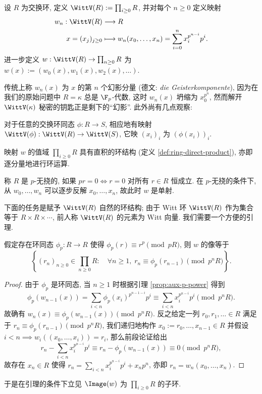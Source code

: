 \begin{definition}
	设 $R$ 为交换环, 定义 $\WittV(R) := \prod_{i \geq 0} R$, 并对每个 $n \geq 0$ 定义映射
	\begin{align*}
		w_n: \WittV(R) & \longrightarrow R \\
		x = (x_j)_{j \geq 0} & \longmapsto w_n(x_0, \ldots, x_n) = \sum_{i=0}^n x_i^{p^{n-i}} p^i.
	\end{align*}
	进一步定义 $w: \WittV(R) \to \prod_{n \geq 0} R$ 为 $w(x) := (w_0(x), w_1(x), w_2(x), \ldots)$.
\end{definition}
传统上称 $w_n(x)$ 为 $x$ 的第 $n$ 个幻影分量 (德文: \textit{die Geisterkomponente}), 因为在我们的原始问题中 $R=\kappa$ 总是 $\F_p$-代数, 这时 $w_n(x)$ 坍缩为 $x_0^{p^n}$, 然而解开 $\WittV(\kappa)$ 秘密的钥匙正是剩下的``幻影''. 此外尚有几点观察:
\begin{compactitem}
	\item 对于任意的交换环同态 $\phi: R \to S$, 相应地有映射 $\WittV(\phi): \WittV(R) \to \WittV(S)$, 它映 $(x_i)_i$ 为 $(\phi(x_i))_i$.
	\item 映射 $w$ 的值域 $\prod_{i \geq 0} R$ 具有直积的环结构 (定义 \ref{def:ring-direct-product}), 亦即逐分量地进行环运算.
	\item 称 $R$ 是 $p$-无挠的, 如果 $pr =0 \iff r=0$ 对所有 $r \in R$ 恒成立. 在 $p$-无挠的条件下, 从 $w_0, \ldots, w_n$ 可以逐步反解 $x_0, \ldots, x_n$, 故此时 $w$ 是单射. 
\end{compactitem}

下面的任务是赋予 $\WittV(R)$ 自然的环结构; 由于 Witt 环 $\WittV(R)$ 作为集合等于 $R \times R \times \cdots$, 前人称 $\WittV(R)$ 的元素为 Witt 向量. 我们需要一个方便的引理.
\begin{lemma}[B.\ Dwork]\label{prop:Dwork-Witt}
	假定存在环同态 $\phi_p: R \to R$ 使得 $\phi_p(r) \equiv r^p \pmod {pR}$, 则 $w$ 的像等于
	\[ \left\{ (r_n)_{n \geq 0} \in \prod_{n \geq 0} R : \quad \forall n \geq 1, \; r_n \equiv \phi_p(r_{n-1}) \pmod {p^n R}  \right\}. \]
\end{lemma}
\begin{proof}
	由于 $\phi_p$ 是环同态, 当 $n \geq 1$ 时根据引理 \ref{prop:aux-p-power} 得到
	\[ \phi_p(w_{n-1}(x)) = \sum_{i < n} \phi_p(x_i)^{p^{n-1-i}} p^i \equiv \sum_{i < n} x_i^{p^{n-i}} p^i \pmod {p^n R}. \]
	故确有 $w_n(x) \equiv \phi_p(w_{n-1}(x)) \pmod {p^n R}$. 反之给定一列 $r_0, r_1, \ldots \in R$ 满足于 $r_n \equiv \phi_p(r_{n-1}) \pmod {p^n R}$, 我们递归地构作 $x_0 := r_0, \ldots, x_{n-1} \in R$ 并假设 $i < n \implies w_i((x_0, \ldots, x_i)) = r_i$, 那么前段论证给出
	\[ r_n - \sum_{i < n} x_i^{p^{n-i}} p^i \equiv r_n - \phi_p(w_{n-1}(x)) \equiv 0 \pmod {p^n R}, \]
	故存在 $x_n \in R$ 使得 $r_n = \sum_{i<n} x_i^{p^{n-i}} p^i + x_n p^n$, 亦即 $r_n = w_n(x_0, \ldots, x_n)$.
\end{proof}
于是在引理的条件下立见 $\Image(w)$ 为 $\prod_{i \geq 0} R$ 的子环.


